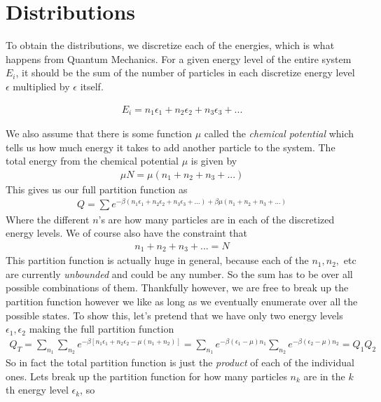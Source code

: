 \section{Distributions}
To obtain the distributions, we discretize each of the energies, which is what happens from Quantum Mechanics. For a given energy level of the entire system $E_i$, it should be the sum of the number of particles in each discretize energy level $\epsilon$ multiplied by $\epsilon$ itself.

\begin{align}
    E_i = n_1\epsilon_1 + n_2\epsilon_2 + n_3\epsilon_3 + ...
\end{align}


We also assume that there is some function $\mu$ called the \emph{chemical potential} which tells us how much energy it takes to add another particle to the system. The total energy from the chemical potential $\mu$ is given by
\begin{align}
    \mu N = \mu(n_1 + n_2 + n_3 + ... ) 
\end{align}
This gives us our full partition function as 
\begin{align}
Q= \sum e^{-\beta(n_1\epsilon_1  +  n_2\epsilon_2 +  n_3\epsilon_3 + ...) + \beta\mu(n_1 + n_2 + n_3 + ...)}
\end{align}
Where the different $n$'s are how many particles are in each of the discretized energy levels. We of course also have the constraint that
\begin{align}
n_1 + n_2 + n_3 + ... = N
\end{align}
This partition function is actually huge in general, because each of the $n_1, n_2,$ etc are currently \emph{unbounded} and could be any number. So the sum has to be over all possible combinations of them.
Thankfully however, we are free to break up the partition function however we like as long as we eventually enumerate over all the possible states. To show this, let's pretend that we have only two energy levels $\epsilon_1, \epsilon_2$ making the full partition function
\begin{align}
    Q_T = \sum_{n_1}\sum_{n_2}e^{-\beta[n_1\epsilon_1 + n_2\epsilon_2 - \mu(n_1 + n_2)]} = \sum_{n_1} e^{-\beta(\epsilon_1-\mu)n_1} \sum_{n_2} e^{-\beta(\epsilon_2 - \mu)n_2} = Q_1Q_2
\end{align}
So in fact the total partition function is just the \emph{product} of each of the individual ones. Lets break up the partition function for how many particles $n_k$ are in the $k$th energy level $\epsilon_k$, so
